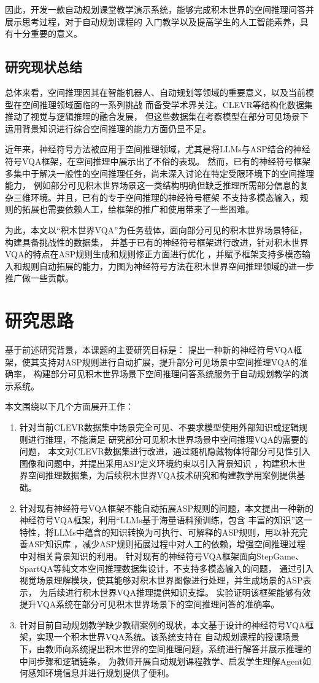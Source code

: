 因此，开发一款自动规划课堂教学演示系统，能够完成积木世界的空间推理问答并展示思考过程，对于自动规划课程的
入门教学以及提高学生的人工智能素养，具有十分重要的意义。
\subsection{研究现状总结}
总体来看，空间推理因其在智能机器人、自动规划等领域的重要意义，以及当前模型在空间推理领域面临的一系列挑战
而备受学术界关注。CLEVR等结构化数据集推动了视觉与逻辑推理的融合发展，
但这些数据集在考察模型在部分可见场景下运用背景知识进行综合空间推理的能力方面仍显不足。

近年来，神经符号方法被应用于空间推理领域，尤其是将LLMs与ASP结合的神经符号VQA框架，在空间推理中展示出了不俗的表现。
然而，已有的神经符号框架多集中于解决一般性的空间推理任务，尚未深入讨论在特定受限环境下的空间推理能力，
例如部分可见积木世界场景这一类结构明确但缺乏推理所需部分信息的复杂三维环境。并且，已有的专于空间推理的神经符号框架
不支持多模态输入，规则的拓展也需要依赖人工，给框架的推广和使用带来了一些困难。

为此，本文以“积木世界VQA”为任务载体，面向部分可见的积木世界场景特征，构建具备挑战性的数据集，
并基于已有的神经符号框架进行改进，针对积木世界VQA的特点在ASP规则生成和规则修正方面进行优化
，并赋予框架支持多模态输入和规则自动拓展的能力，力图为神经符号方法在积木世界空间推理领域的进一步推广做一些贡献。
\section{研究思路}
基于前述研究背景，本课题的主要研究目标是：
提出一种新的神经符号VQA框架，使其支持对ASP规则进行自动扩展，提升部分可见场景中空间推理VQA的准确率，
构建部分可见积木世界场景下空间推理问答系统服务于自动规划教学的演示系统。

本文围绕以下几个方面展开工作：
\begin{enumerate}[nosep]
\item 针对当前CLEVR数据集中场景完全可见、不要求模型使用外部知识或逻辑规则进行推理，不能满足
研究部分可见积木世界场景中空间推理VQA的需要的问题，
本文对CLEVR数据集进行改进，通过随机隐藏物体将部分可见性引入图像和问题中，并提出采用ASP定义环境约束以引入背景知识
，构建积木世界空间推理数据集，为后续积木世界VQA技术研究和构建教学用案例提供基础。
\item 针对现有神经符号VQA框架不能自动拓展ASP规则的问题，本文提出一种新的神经符号VQA框架，利用“LLMs基于海量语料预训练，包含
丰富的知识”这一特性，将LLMs中蕴含的知识转换为可执行、可解释的ASP规则，用以补充完善ASP知识库
，减少ASP规则拓展过程中对人工的依赖，增强空间推理过程中对相关背景知识的利用。
针对现有的神经符号VQA框架面向StepGame、SpartQA等纯文本空间推理数据集设计，不支持多模态输入的问题，
通过引入视觉场景理解模块，使其能够对积木世界图像进行处理，并生成场景的ASP表示，
为后续进行积木世界VQA推理提供知识支撑。
实验证明该框架能够有效提升VQA系统在部分可见积木世界场景下的空间推理问答的准确率。
\item 针对目前自动规划教学缺少教研案例的现状，本文基于设计的神经符号VQA框架，实现一个积木世界VQA系统。该系统支持在
自动规划课程的授课场景下，由教师向系统提出积木世界的空间推理问题，系统进行解答并展示推理的中间步骤和逻辑链条，
为教师开展自动规划课程教学、启发学生理解Agent如何感知环境信息并进行规划提供了便利。
\end{enumerate}

